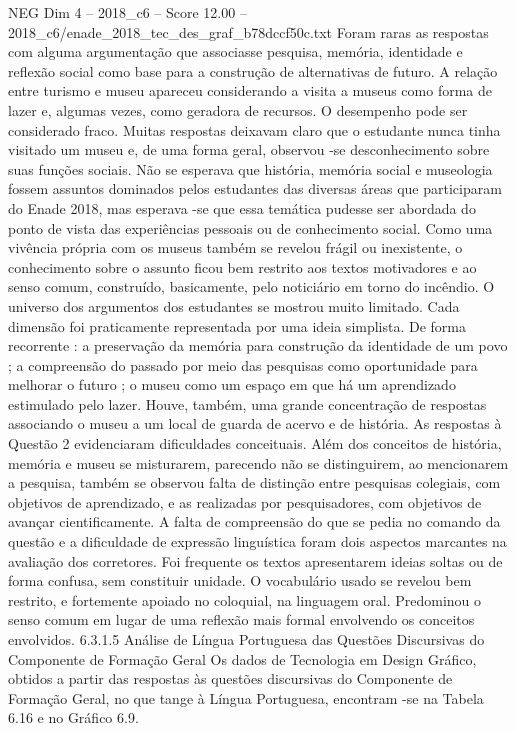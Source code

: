 \begin{textsample}{NEG Dim 4 – 2018\_c6 – Score 12.00 – 2018\_c6/enade\_2018\_tec\_des\_graf\_b78dccf50c.txt}
Foram raras as respostas com alguma argumentação que associasse pesquisa, memória, identidade e reflexão social como base para a construção de alternativas de futuro.
A relação entre turismo e museu apareceu considerando a visita a museus como forma de lazer e, algumas vezes, como geradora de recursos.
O desempenho pode ser considerado fraco.
Muitas respostas deixavam claro que o estudante nunca tinha visitado um museu e, de uma forma geral, observou -se desconhecimento sobre suas funções sociais.
Não se esperava que história, memória social e museologia fossem assuntos dominados pelos estudantes das diversas áreas que participaram do Enade 2018, mas esperava -se que essa temática pudesse ser abordada do ponto de vista das experiências pessoais ou de conhecimento social.
Como uma vivência própria com os museus também se revelou frágil ou inexistente, o conhecimento sobre o assunto ficou bem restrito aos textos motivadores e ao senso comum, construído, basicamente, pelo noticiário em torno do incêndio.
O universo dos argumentos dos estudantes se mostrou muito limitado.
Cada dimensão foi praticamente representada por uma ideia simplista.
De forma recorrente : a preservação da memória para construção da identidade de um povo ; a compreensão do passado por meio das pesquisas como oportunidade para melhorar o futuro ; o museu como um espaço em que há um aprendizado estimulado pelo lazer.
Houve, também, uma grande concentração de respostas associando o museu a um local de guarda de acervo e de história.
As respostas à Questão 2 evidenciaram dificuldades conceituais.
Além dos conceitos de história, memória e museu se misturarem, parecendo não se distinguirem, ao mencionarem a pesquisa, também se observou falta de distinção entre pesquisas colegiais, com objetivos de aprendizado, e as realizadas por pesquisadores, com objetivos de avançar cientificamente.
A falta de compreensão do que se pedia no comando da questão e a dificuldade de expressão linguística foram dois aspectos marcantes na avaliação dos corretores.
Foi frequente os textos apresentarem ideias soltas ou de forma confusa, sem constituir unidade.
O vocabulário usado se revelou bem restrito, e fortemente apoiado no coloquial, na linguagem oral.
Predominou o senso comum em lugar de uma reflexão mais formal envolvendo os conceitos envolvidos. 6.3.1.5 Análise de Língua Portuguesa das Questões Discursivas do Componente de Formação Geral Os dados de Tecnologia em Design Gráfico, obtidos a partir das respostas às questões discursivas do Componente de Formação Geral, no que tange à Língua Portuguesa, encontram -se na Tabela 6.16 e no Gráfico 6.9.

\end{textsample}
